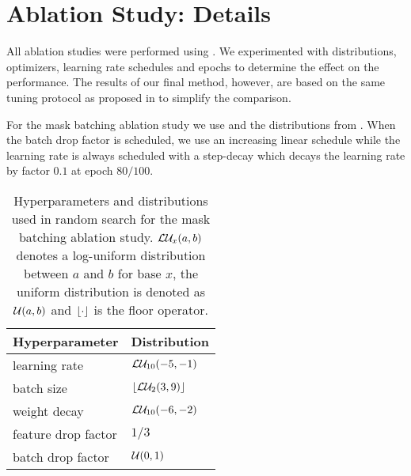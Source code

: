 
\chapter{Ablation Study: Details} %
\label{sec:abl-distr} %
All ablation studies were performed using \domainbed \citep{gulrajani2020search}. We experimented with distributions, optimizers, learning rate schedules and epochs to determine the effect on the performance. The results of our final method, however, are based on the same tuning protocol as proposed in \domainbed to simplify the comparison.

For the mask batching ablation study we use \adam \citep{Kingma2015} and the distributions from . When the batch drop factor is scheduled, we use an increasing linear schedule while the learning rate is always scheduled with a step-decay which decays the learning rate by factor $0.1$ at epoch $80/100$.
\begin{table}[!htbp]
    \centering
    \begin{tabular}{ll}
        \toprule
        \textbf{Hyperparameter} & \textbf{Distribution} \\
        \midrule
        learning rate & $\loguni{-5}{-1}$ \\
        batch size  & $\floor*{\logunitwo{3}{9}}$ \\
        weight decay  & $\loguni{-6}{-2}$ \\
        feature drop factor  & $1/3$ \\
        batch drop factor  & $\uni{0}{1}$ \\
         \bottomrule 
    \end{tabular}
    \caption[Hyperparameters and distributions used for the mask batching ablation study]{Hyperparameters and distributions used in random search for the mask batching ablation study. $\logunix{a}{b}$ denotes a log-uniform distribution between $a$ and $b$ for base $x$, the uniform distribution is denoted as $\uni{a}{b}$ and $\floor*{\cdot}$ is the floor operator.}
    \label{tab:abl-distributions-mask-batching}
\end{table}

